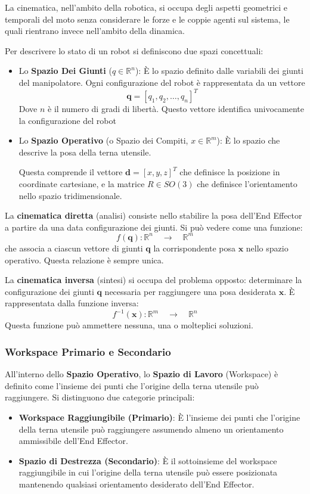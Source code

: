 \documentclass[11pt, a4paper]{report}
\begin{document}
\newpage
La cinematica, nell'ambito della robotica, si occupa degli aspetti geometrici e temporali del moto senza considerare le forze e le coppie agenti sul sistema, le quali rientrano invece nell'ambito della dinamica.

Per descrivere lo stato di un robot si definiscono due spazi concettuali:
\begin{itemize}
    \item Lo \textbf{Spazio Dei Giunti} ($q \in \mathbb{R}^{n}$): È lo spazio definito dalle variabili dei giunti del manipolatore. Ogni configurazione del robot è rappresentata da un vettore
    \[
        \bm{q} = [q_1, q_2, \dots, q_n]^T
    \]
    Dove \(n\) è il numero di gradi di libertà. Questo vettore identifica univocamente la configurazione del robot
    \item Lo \textbf{Spazio Operativo} (o Spazio dei Compiti, $x \in \mathbb{R}^{m}$): È lo spazio che descrive la posa della terna utensile.

    Questa comprende il vettore \(\mathbf{d} = [x, y, z]^T\) che definisce la posizione in coordinate cartesiane, e la matrice \(R \in SO(3)\) che definisce l'orientamento nello spazio tridimensionale.
\end{itemize}
La \textbf{cinematica diretta} (analisi) consiste nello stabilire la posa dell'End Effector a partire da una data configurazione dei giunti. Si può vedere come una funzione:
\[
    f(\mathbf{q}) : \mathbb{R}^{n} \quad \longrightarrow \quad \mathbb{R}^{m}
\]
che associa a ciascun vettore di giunti $\mathbf{q}$ la corrispondente posa $\mathbf{x}$ nello spazio operativo. Questa relazione è sempre unica.

La \textbf{cinematica inversa} (sintesi) si occupa del problema opposto: determinare la configurazione dei giunti $\mathbf{q}$ necessaria per raggiungere una posa desiderata $\mathbf{x}$. È rappresentata dalla funzione inversa:
\[
    f^{-1}(\mathbf{x}) : \mathbb{R}^{m} \quad \longrightarrow \quad \mathbb{R}^{n}
\]
Questa funzione può ammettere nessuna, una o molteplici soluzioni.

\subsubsection*{Workspace Primario e Secondario}
All'interno dello \textbf{Spazio Operativo}, lo \textbf{Spazio di Lavoro} (Workspace) è definito come l'insieme dei punti che l'origine della terna utensile può raggiungere.
Si distinguono due categorie principali:
\begin{itemize}
    \item \textbf{Workspace Raggiungibile (Primario)}: È l'insieme dei punti che l'origine della terna utensile può raggiungere assumendo almeno un orientamento ammissibile dell'End Effector.
    \item \textbf{Spazio di Destrezza (Secondario)}: È il sottoinsieme del workspace raggiungibile in cui l'origine della terna utensile può essere posizionata mantenendo qualsiasi orientamento desiderato dell'End Effector.
\end{itemize}
\end{document}
